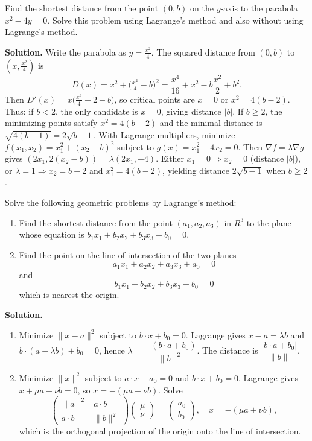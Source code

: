 \begin{problembox}
Find the shortest distance from the point \((0, b)\) on the \( y \)-axis to the parabola \( x^2 - 4y = 0 \). Solve this problem using Lagrange's method and also without using Lagrange's method.
\end{problembox}

\noindent\textbf{Solution.}
Write the parabola as $y=\tfrac{x^2}{4}$. The squared distance from $(0,b)$ to $(x,\tfrac{x^2}{4})$ is
\[D(x)=x^2+\Big(\tfrac{x^2}{4}-b\Big)^2=\frac{x^4}{16}+x^2-b\frac{x^2}{2}+b^2.
\]
Then $D'(x)=x\Big(\tfrac{x^2}{4}+2-b\Big)$, so critical points are $x=0$ or $x^2=4(b-2)$. Thus: if $b<2$, the only candidate is $x=0$, giving distance $|b|$. If $b\ge 2$, the minimizing points satisfy $x^2=4(b-2)$ and the minimal distance is $\sqrt{4(b-1)}=2\sqrt{b-1}$.
With Lagrange multipliers, minimize $f(x_1,x_2)=x_1^2+(x_2-b)^2$ subject to $g(x)=x_1^2-4x_2=0$. Then $\nabla f=\lambda\nabla g$ gives $(2x_1,2(x_2-b))=\lambda(2x_1,-4)$. Either $x_1=0\Rightarrow x_2=0$ (distance $|b|$), or $\lambda=1\Rightarrow x_2=b-2$ and $x_1^2=4(b-2)$, yielding distance $2\sqrt{b-1}$ when $b\ge2$.

\begin{problembox}
Solve the following geometric problems by Lagrange's method:
\begin{enumerate}[label=(\alph*)]
    \item Find the shortest distance from the point \((a_1, a_2, a_3)\) in \( R^3 \) to the plane whose equation is \( b_1x_1 + b_2x_2 + b_3x_3 + b_0 = 0 \).
    \item Find the point on the line of intersection of the two planes
    \[a_1x_1 + a_2x_2 + a_3x_3 + a_0 = 0\]
    and
    \[b_1x_1 + b_2x_2 + b_3x_3 + b_0 = 0\]
    which is nearest the origin.
\end{enumerate}
\end{problembox}

\noindent\textbf{Solution.}
\begin{enumerate}[label=(\alph*)]
    \item Minimize $\|x-a\|^2$ subject to $b\cdot x+b_0=0$. Lagrange gives $x-a=\lambda b$ and $b\cdot(a+\lambda b)+b_0=0$, hence $\lambda=\dfrac{-(b\cdot a+b_0)}{\|b\|^2}$. The distance is $\dfrac{|b\cdot a+b_0|}{\|b\|}$.
    \item Minimize $\|x\|^2$ subject to $a\cdot x+a_0=0$ and $b\cdot x+b_0=0$. Lagrange gives $x+\mu a+\nu b=0$, so $x=-(\mu a+\nu b)$. Solve
    \[\begin{pmatrix}\|a\|^2 & a\cdot b\\ a\cdot b & \|b\|^2\end{pmatrix}\begin{pmatrix}\mu\\ \nu\end{pmatrix}=\begin{pmatrix}a_0\\ b_0\end{pmatrix},\quad x=-(\mu a+\nu b),\]
    which is the orthogonal projection of the origin onto the line of intersection.
\end{enumerate}

